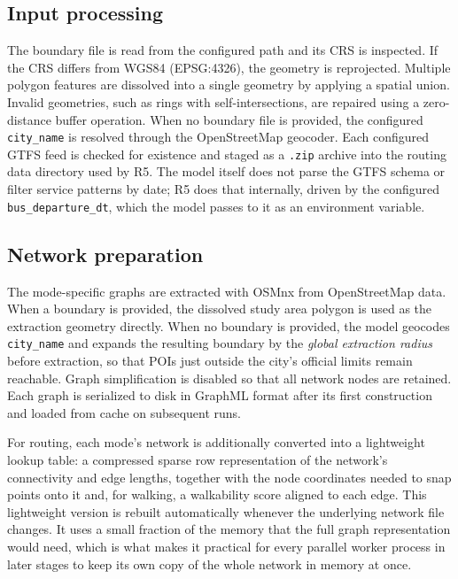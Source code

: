 \documentclass{article}
\begin{document}
\subsection{Input processing}
The boundary file is read from the configured path and its CRS is inspected. If the CRS differs from WGS84 (EPSG:4326), the geometry is reprojected. Multiple polygon features are dissolved into a single geometry by applying a spatial union. Invalid geometries, such as rings with self-intersections, are repaired using a zero-distance buffer operation. When no boundary file is provided, the configured \texttt{city\_name} is resolved through the OpenStreetMap geocoder.
Each configured GTFS feed is checked for existence and staged as a \texttt{.zip} archive into the routing data directory used by R5. The model itself does not parse the GTFS schema or filter service patterns by date; R5 does that internally, driven by the configured \texttt{bus\_departure\_dt}, which the model passes to it as an environment variable.

\subsection{Network preparation}
The mode-specific graphs are extracted with OSMnx from OpenStreetMap data. When a boundary is provided, the dissolved study area polygon is used as the extraction geometry directly. When no boundary is provided, the model geocodes \texttt{city\_name} and expands the resulting boundary by the \emph{global extraction radius} before extraction, so that POIs just outside the city's official limits remain reachable. Graph simplification is disabled so that all network nodes are retained. Each graph is serialized to disk in GraphML format after its first construction and loaded from cache on subsequent runs.

For routing, each mode's network is additionally converted into a lightweight lookup table: a compressed sparse row representation of the network's connectivity and edge lengths, together with the node coordinates needed to snap points onto it and, for walking, a walkability score aligned to each edge. This lightweight version is rebuilt automatically whenever the underlying network file changes. It uses a small fraction of the memory that the full graph representation would need, which is what makes it practical for every parallel worker process in later stages to keep its own copy of the whole network in memory at once.
\end{document}
